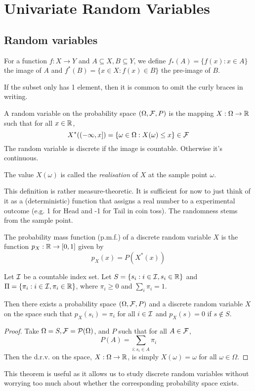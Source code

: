 \documentclass[11pt]{article}
\begin{document}
\section{Univariate Random Variables}
\subsection{Random variables}
\begin{definition}
  For a function \(f:X\to Y\) and \(A\subseteq X,B\subseteq Y\), we define \(f_*(A)=\{f(x):x\in A\}\) the image of \(A\) and \(f^*(B)=\{x\in X:f(x)\in B\}\) the pre-image of \(B\).
\end{definition}
If the subset only has 1 element, then it is common to omit the curly braces in writing.

\begin{definition}
  A random variable on the probability space \((\Omega,\cal{F},P)\) is the mapping \(X:\Omega\to\R\) such that for all \(x\in\R\),
  \[X^*(\lointerval{-\infty,x})=\{\omega\in\Omega:X(\omega)\leq x\}\in\cal{F}\]
  The random variable is discrete if the image is countable. Otherwise it's continuous.

  The value \(X(\omega)\) is called the \emph{realisation} of \(X\) at the sample point \(\omega\).
\end{definition}
This definition is rather measure-theoretic. It is sufficient for now to just think of it as a (deterministic) function that assigns a real number to a experimental outcome (e.g. 1 for Head and -1 for Tail in coin toss). The randomness stems from the sample point.

\begin{definition}
  The probability mass function (p.m.f.) of a discrete random variable \(X\) is the function \(p_X:\R\to[0,1]\) given by 
  \[p_X(x)=P(X^*(x))\]
\end{definition}

\begin{theorem}
  Let \(\cal{I}\) be a countable index set. Let \(S=\{s_i:i\in\cal{I},s_i\in\R\}\) and \(\Pi=\{\pi_i:i\in\cal{I},\pi_i\in\R\}\), where \(\pi_i\geq 0\) and \(\sum_i \pi_i =1\). 
  
  Then there exists a probability space \((\Omega,\cal{F},P)\) and a discrete random variable \(X\) on the space such that \(p_X(s_i)=\pi_i\) for all \(i\in\cal{I}\) and \(p_X(s)=0\) if \(s\notin S\).
\end{theorem}
\begin{proof}
  Take \(\Omega=S,\cal{F}=\cal{P}(\Omega)\), and \(P\) such that for all \(A\in\cal{F}\),
  \[P(A)=\sum_{i:s_i\in A}\pi_i\]
  Then the d.r.v. on the space, \(X:\Omega\to\R\), is simply \(X(\omega)=\omega\) for all \(\omega\in\Omega\).
\end{proof}
This theorem is useful as it allows us to study discrete random variables without worrying too much about whether the corresponding probability space exists.
\end{document}
